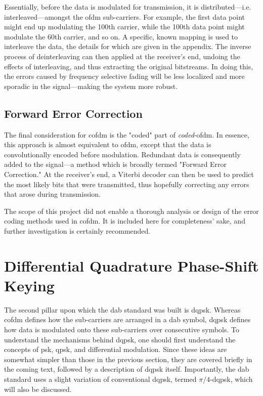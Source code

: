 \documentclass[class=report,11pt,crop=false]{standalone}
\begin{document}
Essentially, before the data is modulated for transmission, it is distributed---i.e. interleaved---amongst the \gls{ofdm} sub-carriers. For example, the first data point might end up modulating the 100th carrier, while the 100th data point might modulate the 60th carrier, and so on. A specific, known mapping is used to interleave the data, the details for which are given in the appendix. The inverse process of deinterleaving can then applied at the receiver's end, undoing the effects of interleaving, and thus extracting the original bitstreams. In doing this, the errors caused by frequency selective fading will be less localized and more sporadic in the signal---making the system more robust.

\subsection{Forward Error Correction}
The final consideration for \gls{cofdm} is the "coded" part of \emph{coded}-\gls{ofdm}. In essence, this approach is almost equivalent to \gls{ofdm}, except that the data is convolutionally encoded before modulation. Redundant data is consequently added to the signal---a method which is broadly termed "Forward Error Correction." At the receiver's end, a Viterbi decoder can then be used to predict the most likely bits that were transmitted, thus hopefully correcting any errors that arose during transmission.

The scope of this project did not enable a thorough analysis or design of the error coding methods used in \gls{cofdm}. It is included here for completeness' sake, and further investigation is certainly recommended.

\section{Differential Quadrature Phase-Shift Keying \label{sect:dab-std_psk}}
The second pillar upon which the \gls{dab} standard was built is \gls{dqpsk}. Whereas \gls{cofdm} defines how the sub-carriers are arranged in a \gls{dab} symbol, \gls{dqpsk} defines how data is modulated onto these sub-carriers over consecutive symbols. To understand the mechanisms behind \gls{dqpsk}, one should first understand the concepts of \gls{psk}, \gls{qpsk}, and differential modulation. Since these ideas are somewhat simpler than those in the previous section, they are covered briefly in the coming text, followed by a description of \gls{dqpsk} itself. Importantly, the \gls{dab} standard uses a slight variation of conventional \gls{dqpsk}, termed \(\pi/4\)-\gls{dqpsk}, which will also be discussed.
\end{document}
